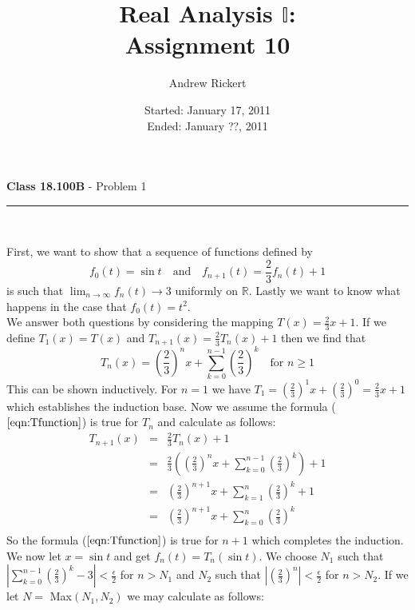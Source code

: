 \documentclass[11pt,reqno]{article}
\title{Real Analysis $\mathbb{I}$: \\ Assignment 10}
\author{Andrew Rickert}
\date{Started: January 17, 2011 \\ \hspace{1pt} Ended: January ??,  2011}                                           %
\begin{document}
\maketitle


\begin{flushleft} 
\textbf{Class 18.100B} - Problem 1\\
\rule{500pt}{1pt}\\
\end{flushleft} 

\noindent First, we want to show that a sequence of functions defined by 
\[ f_0(t) = \sin t \quad \text{and} \quad f_{n+1}(t) = \frac{2}{3}f_n(t) + 1\]
is such that $\lim_{n \to \infty} f_n(t) \to 3$ uniformly on $\mathbb{R}$. Lastly we want to know what happens in the case that $f_0(t) = t^2$.\\
\indent We answer both questions by considering the mapping $T(x) = \frac{2}{3}x + 1$. If we define $T_1(x) = T(x)$ and $T_{n+1}(x) = \frac{2}{3}T_n(x) + 1$ then we find that
\begin{equation}
T_n(x) = \left( \frac{2}{3} \right)^n x + \sum_{k=0}^{n-1} \left( \frac{2}{3} \right)^k \quad \text{for $n \ge 1$} \label{eqn:Tfunction}
\end{equation}
This can be shown inductively. For $n=1$ we have $T_1 =  \left( \frac{2}{3} \right)^1 x +  \left( \frac{2}{3} \right)^0 =  \frac{2}{3} x + 1$ which establishes the induction base. Now we assume the formula ($\ref{eqn:Tfunction}$) is true for $T_n$ and calculate as follows:
\begin{eqnarray*}
T_{n+1}(x) &=& \frac{2}{3}T_n(x) + 1 \\
		 &=& \frac{2}{3}\left( \left( \frac{2}{3} \right)^n x + \sum_{k=0}^{n-1} \left( \frac{2}{3} \right)^k \right) + 1 \\
		 &=& \left( \frac{2}{3} \right)^{n+1} x + \sum_{k=1}^{n} \left( \frac{2}{3} \right)^k + 1 \\
		 &=& \left( \frac{2}{3} \right)^{n+1} x + \sum_{k=0}^{n} \left( \frac{2}{3} \right)^k\\
\end{eqnarray*}
So the formula ($\ref{eqn:Tfunction}$) is true for $n+1$ which completes the induction.\\
We now let $x = \sin t$ and get $f_n(t) = T_n(\sin t)$. We choose $N_1$ such that $|\sum_{k=0}^{n-1} \left( \frac{2}{3} \right)^k - 3| < \frac{\epsilon}{2}$ for $n > N_1$ and $N_2$ such that $|\left( \frac{2}{3} \right)^n| < \frac{\epsilon}{2}$ for $n > N_2$. If we let $N = $ Max$(N_1, N_2)$ we may calculate as follows:
\end{document}
